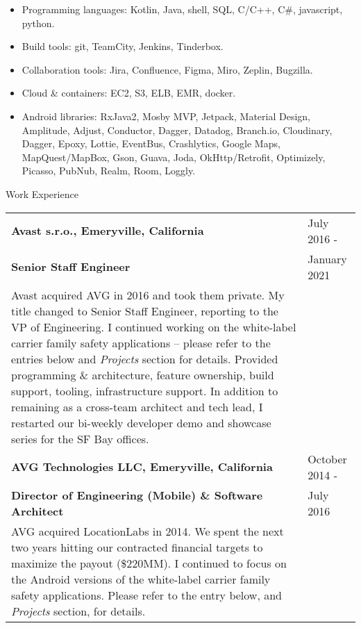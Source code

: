 \begin{itemize}
\item Programming languages: Kotlin, Java, shell, SQL, C/C++, C\#, javascript, python. \\[-18pt]
\item Build tools: git, TeamCity, Jenkins, Tinderbox.   \\[-18pt]
\item Collaboration tools: Jira, Confluence, Figma, Miro, Zeplin, Bugzilla.    \\[-18pt]
\item Cloud \& containers: EC2, S3, ELB, EMR, docker.  \\[-18pt]
\item Android libraries:
	   RxJava2, Mosby MVP, Jetpack, Material Design,
	   Amplitude, Adjust, Conductor, Dagger, Datadog, Branch.io, Cloudinary, Dagger, Epoxy, Lottie, EventBus, Crashlytics,
	   Google Maps, MapQuest/MapBox, Gson, Guava, Joda, OkHttp/Retrofit, Optimizely, Picasso, PubNub,
	   Realm, Room, Loggly. \\
\end{itemize}


\begin{bf} \large
Work Experience
\end{bf}
\medskip

\begin{tabular}{p{5.2in}@{\hspace{1.5cm}}l}

	\bf  Avast s.r.o., Emeryville, California   	    & July 2016 -  \\
	\bf  Senior Staff Engineer	& January 2021 \\[4pt]
	
	   Avast acquired AVG in 2016 and took them private.  My title changed to Senior Staff Engineer,
	   reporting to the VP of Engineering. 
	   I continued working on the white-label carrier family safety applications --
           please refer to the entries below and {\it Projects} section for details.
	   Provided programming \& architecture, 
		feature ownership, build support, tooling, infrastructure support. 
	    In addition to remaining as a cross-team architect and tech lead,
	   I restarted our bi-weekly developer demo and showcase series for the SF Bay offices.
		 \\[9pt]
	   
	\bf AVG Technologies LLC, Emeryville, California   	& October 2014 -  \\
	\bf  Director of Engineering (Mobile)  \& Software Architect 	& July 2016 \\[4pt]
	
	   AVG acquired LocationLabs in 2014. We spent the next two years hitting our contracted
	   financial targets to maximize the payout (\$220MM).   
	   I continued to focus on the Android versions of the white-label carrier family safety applications.
	   Please refer to the entry below, and {\it Projects} section, for details. \\[9pt]
	   
	
	   

\end{tabular}

